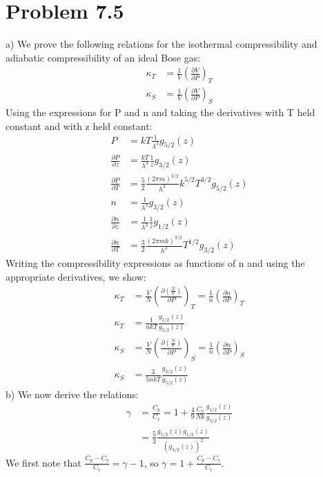 \documentclass[a4paper,11pt]{article}
\numberwithin{equation}{section}
\begin{document}
\section{Problem 7.5}
a) We prove the following relations for the isothermal compressibility and adiabatic compressibility of an ideal Bose gas:
\begin{align}
 \kappa_T &= \frac{1}{V}\left(\frac{\partial V}{\partial P}\right)_T\\
 \kappa_S &= \frac{1}{V}\left(\frac{\partial V}{\partial P}\right)_S
\end{align}
Using the expressions for P and n and taking the derivatives with T held constant and with z held constant:
\begin{align}
 P &= kT\frac{1}{\lambda^3}g_{5/2}(z)\\
 \frac{\partial P}{\partial z} &= \frac{kT}{\lambda^3}\frac{1}{z}g_{3/2}(z)\\
 \frac{\partial P}{\partial T} &= \frac{5}{2}\frac{(2\pi m)^{3/2}}{h^3}k^{5/2}T^{3/2}g_{5/2}(z)\\
 n &= \frac{1}{\lambda^3}g_{3/2}(z)\\
 \frac{\partial n}{\partial z} &= \frac{1}{\lambda^3}\frac{1}{z}g_{1/2}(z)\\
 \frac{\partial n}{\partial T} &= \frac{3}{2}\frac{(2\pi mk)^{3/2}}{h^3}T^{1/2}g_{3/2}(z)
\end{align}
Writing the compressibility expressions as functions of n and using the appropriate derivatives, we show:
\begin{align}
 \kappa_T &= \frac{V}{N}\left(\frac{\partial (\frac{N}{V})}{\partial P}\right)_T
	      = \frac{1}{n}\left(\frac{\partial n}{\partial P}\right)_T\\
 \kappa_T &= \frac{1}{nkT}\frac{g_{1/2}(z)}{g_{3/2}(z)}\\
 \kappa_S &= \frac{V}{N}\left(\frac{\partial (\frac{N}{V})}{\partial P}\right)_S
	      = \frac{1}{n}\left(\frac{\partial n}{\partial P}\right)_S\\
 \kappa_S &= \frac{3}{5nkT}\frac{g_{3/2}(z)}{g_{5/2}(z)}
\end{align}
b) We now derive the relations:
\begin{align}
 \gamma &= \frac{C_p}{C_v} = 1 + \frac{4}{9}\frac{C_v}{Nk}\frac{g_{1/2}(z)}{g_{3/2}(z)}\\
        &= \frac{5}{3}\frac{g_{5/2}(z)g_{1/2}(z)}{\left(g_{3/2}(z) \right)^2}
\end{align}
We first note that $\frac{C_p-C_v}{C_v}=\gamma-1$, so $\gamma = 1+\frac{C_p-C_v}{C_v}$.
\end{document}
